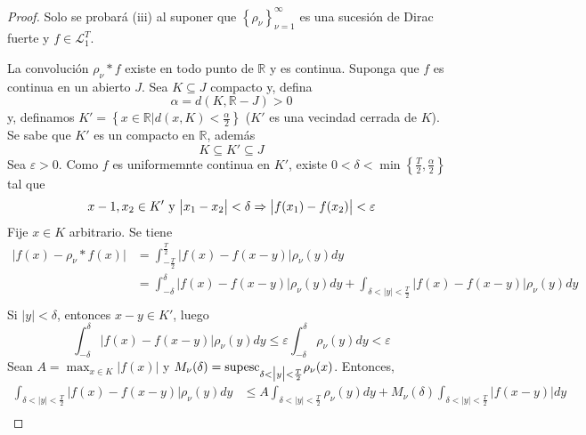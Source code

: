 \documentclass[12pt]{report}
\theoremstyle{largebreak}
\newcommand\abs[1]{\ensuremath{\big|#1\big|}}
\begin{document}
    \begin{proof}
        Solo se probará (iii) al suponer que $\left\{ \rho_\nu\right\}_{\nu=1}^\infty$ es una sucesión de Dirac fuerte y $f\in\mathcal{L}_1^T$.

        La convolución $\rho_\nu*f$ existe en todo punto de $\mathbb{R}$ y es continua. Suponga que $f$ es continua en un abierto $J$. Sea $K\subseteq J$ compacto y, defina
        \begin{equation*}
            \alpha=d(K,\mathbb{R}-J)>0
        \end{equation*}
        y, definamos $K'=\left\{x\in\mathbb{R}\Big|d(x,K)<\frac{\alpha}{2} \right\}$ ($K'$ es una vecindad cerrada de $K$). Se sabe que $K'$ es un compacto en $\mathbb{R}$, además
        \begin{equation*}
            K\subseteq K'\subseteq J
        \end{equation*}
        Sea $\varepsilon>0$. Como $f$ es uniformemnte continua en $K'$, existe $0<\delta<\min\left\{\frac{T}{2},\frac{\alpha}{2}\right\}$ tal que
        \begin{equation*}
            x-1,x_2\in K'\textup{ y }\abs{x_1-x_2}<\delta\Rightarrow\abs{f(x_1)-f(x_2)}<\varepsilon
        \end{equation*}
        Fije $x\in K$ arbitrario. Se tiene
        \begin{equation*}
            \begin{split}
                \abs{f(x)-\rho_\nu*f(x)}&=\int_{-\frac{T}{2}}^{\frac{T}{2}}\abs{f(x)-f(x-y)}\rho_\nu(y)dy\\
                &=\int_{-\delta}^{\delta}\abs{f(x)-f(x-y)}\rho_\nu(y)dy+\int_{\delta<\abs{y}<\frac{T}{2}}\abs{f(x)-f(x-y)}\rho_\nu(y)dy\\
            \end{split}
        \end{equation*}
        Si $\abs{y}<\delta$, entonces $x-y\in K'$, luego
        \begin{equation*}
            \int_{-\delta}^{\delta}\abs{f(x)-f(x-y)}\rho_\nu(y)dy\leq\varepsilon\int_{-\delta}^{\delta}\rho_\nu(y)dy<\varepsilon
        \end{equation*}
        Sean $A=\max_{x\in K}\abs{f(x)}$ y $M_\nu(\delta)=\textup{supesc}_{\delta<\abs{y}<\frac{T}{2}}\rho_\nu(x)$. Entonces,
        \begin{equation*}
            \begin{split}
                \int_{\delta<\abs{y}<\frac{T}{2}}\abs{f(x)-f(x-y)}\rho_\nu(y)dy&\leq A\int_{\delta<\abs{y}<\frac{T}{2}}\rho_\nu(y)dy+M_\nu(\delta)\int_{\delta<\abs{y}<\frac{T}{2}}\abs{f(x-y)}dy\\

\end{split}
\end{equation*}
\end{proof}
\end{document}
